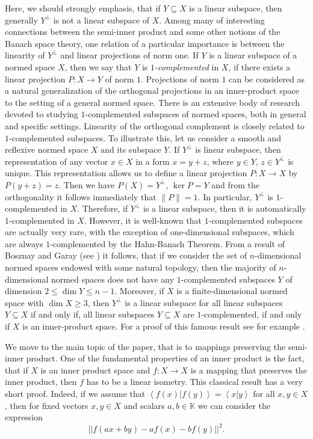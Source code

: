 \documentclass[12pt, reqno]{amsart}
\theoremstyle{definition}
\theoremstyle{remark}
\numberwithin{equation}{section}
\newcommand{\ip}[2]{\left\langle#1|#2\right\rangle}
\begin{document}
Here, we should strongly emphasis, that if $Y \subseteq X$ is a linear subspace, then generally $Y^{\perp}$ is not a linear subspace of $X$. Among many of interesting connections between the semi-inner product and some other notions of the Banach space theory, one relation of a particular importance is between the linearity of $Y^{\perp}$ and linear projections of norm one. If $Y$ is a linear subspace of a normed space $X$, then we say that $Y$ is \emph{$1$-complemented} in $X$, if there exists a linear projection $P: X \to Y$ of norm $1$. Projections of norm $1$ can be considered as a natural generalization of the orthogonal projections in an inner-product space to the setting of a general normed space. There is an extensive body of research devoted to studying $1$-complemented subspaces of normed spaces, both in general and specific settings. Linearity of the orthogonal complement is closely related to $1$-complemented subspaces. To illustrate this, let us consider a smooth and reflexive normed space $X$ and its subspace $Y$. If $Y^{\perp}$ is linear subspace, then representation of any vector $x \in X$ in a form $x=y+z$, where $y \in Y$, $z \in Y^{\perp}$ is unique. This representation allows us to define a linear projection $P:X \to X$ by $P(y+z)=z.$ Then we have $P(X)=Y^{\perp}$, $\ker P = Y$ and from the orthogonality it follows immediately that $\|P\|=1$. In particular,  $Y^{\perp}$ is $1$-complemented in $X$. Therefore, if $Y^{\perp}$ is a linear subspace, then it is automatically $1$-complemented in $X$. However, it is well-known that $1$-complemented subspaces are actually very rare, with the exception of one-dimensional subspaces, which are always $1$-complemented by the Hahn-Banach Theorem. From a result of Bosznay and Garay (see \cite{bosznay}) it follows, that if we consider the set of $n$-dimensional normed spaces endowed with some natural topology, then the majority of $n$-dimensional normed spaces does not have any $1$-complemented subspaces $Y$ of dimension $2 \leq \dim Y \leq n-1$. Moreover, if $X$ is a finite-dimensional normed space with $\dim X\geq 3$, then $Y^{\perp}$ is a linear subspace for all linear subspaces $Y\subseteq X$ if and only if, all linear subspaces $Y \subseteq X$ are $1$-complemented, if and only if $X$ is an inner-product space. For a proof of this famous result see for example \cite{philips}.  

We move to the main topic of the paper, that is to mappings preserving the semi-inner product. One of the fundamental properties of an inner product is the fact, that if $X$ is an inner product space and $f\colon X \to X$ is a mapping that preserves the inner product, then $f$ has to be a linear isometry. This classical result has a very short proof. Indeed, if we assume that $\ip{f(x)}{f(y)}=\ip{x}{y}$ for all $x, y \in X$, then for fixed vectors $x, y \in X$ and scalars $a, b \in \mathbb{K}$ we can consider the expression
$$||f \left ( ax + by \right ) - af(x) - bf(y) ||^2.$$
\end{document}

